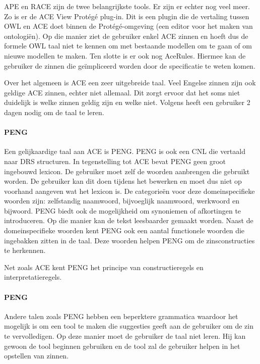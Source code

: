 \documentclass[]{article}
\begin{document}
APE en RACE zijn de twee belangrijkste tools. Er zijn er echter nog veel meer. Zo is er de ACE View Protégé plug-in. Dit is een plugin die de vertaling tussen OWL en ACE doet binnen de Protégé-omgeving (een editor voor het maken van ontologiën). Op die manier ziet de gebruiker enkel ACE zinnen en hoeft dus de formele OWL taal niet te kennen om met bestaande modellen om te gaan of om nieuwe modellen te maken. Ten slotte is er ook nog AceRules. Hiermee kan de gebruiker de zinnen die geïmpliceerd worden door de specificatie te weten komen.

Over het algemeen is ACE een zeer uitgebreide taal. Veel Engelse zinnen zijn ook geldige ACE zinnen, echter niet allemaal. Dit zorgt ervoor dat het soms niet duidelijk is welke zinnen geldig zijn en welke niet. Volgens \cite{Fuchs2008} heeft een gebruiker 2 dagen nodig om de taal te leren.

\paragraph{PENG} Een gelijkaardige taal aan ACE is PENG\cite{Schwitter2002}. PENG is ook een CNL die vertaald naar DRS structuren. In tegenstelling tot ACE bevat PENG geen groot ingebouwd lexicon. De gebruiker moet zelf de woorden aanbrengen die gebruikt worden. De gebruiker kan dit doen tijdens het bewerken en moet dus niet op voorhand aangeven wat het lexicon is. De categorieën voor deze domeinspecifieke woorden zijn: zelfstandig naamwoord, bijvoeglijk naamwoord, werkwoord en bijwoord. PENG biedt ook de mogelijkheid om synoniemen of afkortingen te introduceren. Op die manier kan de tekst leesbaarder gemaakt worden. Naast de domeinspecifieke woorden kent PENG ook een aantal functionele woorden die ingebakken zitten in de taal. Deze woorden helpen PENG om de zinsconstructies te herkennen.

Net zoals ACE kent PENG het principe van constructieregels en interpretatieregels. %

\paragraph{PENG} Andere talen zoals PENG\cite{Schwitter2002} hebben een beperktere grammatica waardoor het mogelijk is om een tool te maken die suggesties geeft aan de gebruiker om de zin te vervolledigen. Op deze manier moet de gebruiker de taal niet leren. Hij kan gewoon de tool beginnen gebruiken en de tool zal de gebruiker helpen in het opstellen van zinnen.
\end{document}
